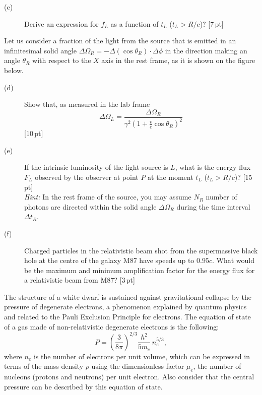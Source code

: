 \begin{description}
\item[(c)] Derive an expression for $f_L$ as a function of $t_L$
  ($t_L > R/c$)? \hfill[7\,pt]
\end{description}

Let us consider a fraction of the light from the source that is emitted in an
infinitesimal solid angle
$\Delta\Omega_R = -\Delta(\cos\theta_R) \cdot \Delta\phi$ in the direction
making an angle $\theta_R$ with respect to the $X$ axis in the rest frame, as
it is shown on the figure below.


\begin{description}
\item[(d)] Show that, as measured in the lab frame
  \[ \Delta\Omega_L = \frac{\Delta\Omega_R}
     {\gamma^2\left(1 + \frac{v}{c}\cos\theta_R\right)^2} \]
  \hfill[10\,pt]
\item[(e)] If the intrinsic luminosity of the light source is $L$, what is the
  energy flux $F_L$ observed by the observer at point $P$ at the moment $t_L$
  ($t_L > R/c$)? \hfill[15\,pt]\\
  \textit{Hint:} In the rest frame of the source, you may assume $N_R$ number
  of photons are directed within the solid angle $\Delta\Omega_R$ during the
  time interval $\Delta t_R$.
\item[(f)] Charged particles in the relativistic beam shot from the
  supermassive black hole at the centre of the galaxy M87 have speeds up to
  $0.95c$. What would be the maximum and minimum amplification factor for the
  energy flux for a relativistic beam from M87? \hfill[3\,pt]
\end{description}

The structure of a white dwarf is sustained against gravitational collapse by
the pressure of degenerate electrons, a phenomenon explained by quantum
physics and related to the Pauli Exclusion Principle for electrons. The
equation of state of a gas made of non-relativistic degenerate electrons is
the following:
\[ P = \left(\frac{3}{8\pi}\right)^{2/3}\frac{h^2}{5m_e}\,n_e^{5/3}, \]
where $n_e$ is the number of electrons per unit volume, which can be expressed
in terms of the mass density $\rho$ using the dimensionless factor $\mu_e$,
the number of nucleons (protons and neutrons) per unit electron. Also consider
that the central pressure can be described by this equation of state.

